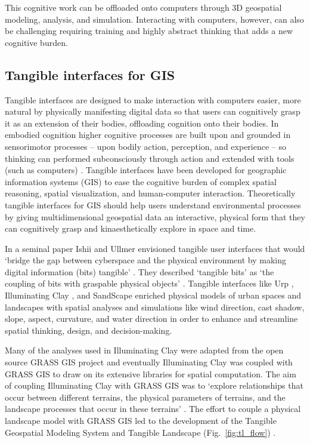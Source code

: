 \documentclass{isprs}
\begin{document}
This cognitive work can be offloaded onto computers through 3D geospatial modeling, analysis, and simulation. Interacting with computers, however, can also be challenging requiring training and highly abstract thinking that adds a new cognitive burden.

\subsection{Tangible interfaces for GIS}
%
Tangible interfaces are designed to make interaction with computers easier, more natural
by physically manifesting digital data so that users can cognitively grasp it as an extension of their bodies, offloading cognition onto their bodies. 
%
In embodied cognition higher cognitive processes are built upon and grounded in sensorimotor processes -- upon bodily action, perception, and experience -- 
so thinking can performed subconsciously through action and extended with tools (such as computers) \cite{Kirsh2013}.
%
Tangible interfaces have been developed for geographic information systems (GIS) to ease the cognitive burden of complex spatial reasoning, spatial visualization, and human-computer interaction. 
%
Theoretically tangible interfaces for GIS should help users understand environmental processes
by giving multidimensional geospatial data an interactive, physical form 
that they can cognitively grasp and kinaesthetically explore in space and time. 

In a seminal paper Ishii and Ullmer envisioned tangible user interfaces that would 
`bridge the gap between cyberspace and the physical environment by making digital information (bits) tangible' \cite{Ishii1997}.
They described `tangible bits' as `the coupling of bits with graspable physical objects' \cite{Ishii1997}. 
Tangible interfaces like 
Urp \cite{Underkoffler1999}, Illuminating Clay \cite{Piper2002}, and SandScape \cite{Ratti2004} 
enriched physical models of urban spaces and landscapes with spatial analyses and simulations 
like wind direction, cast shadow, slope, aspect, curvature, and water direction
in order to enhance and streamline spatial thinking, design, and decision-making.

Many of the analyses used in Illuminating Clay were adapted from the open source GRASS GIS project \cite{Piper2002a} 
and eventually 
Illuminating Clay was coupled with GRASS GIS 
to draw on its extensive libraries for spatial computation. 
The aim of coupling Illuminating Clay with GRASS GIS was to 
`explore relationships that occur between different terrains, the physical parameters of terrains, and the landscape processes that occur in these terrains' \cite{Mitasova2006}. 
%
The effort to couple a physical landscape model with GRASS GIS led to the development of 
the Tangible Geospatial Modeling System \cite{Tateosian2010} and Tangible Landscape (Fig.~\ref{fig:tl_flow}) \cite{Petrasova2014,Petrasova2015}.
\end{document}
